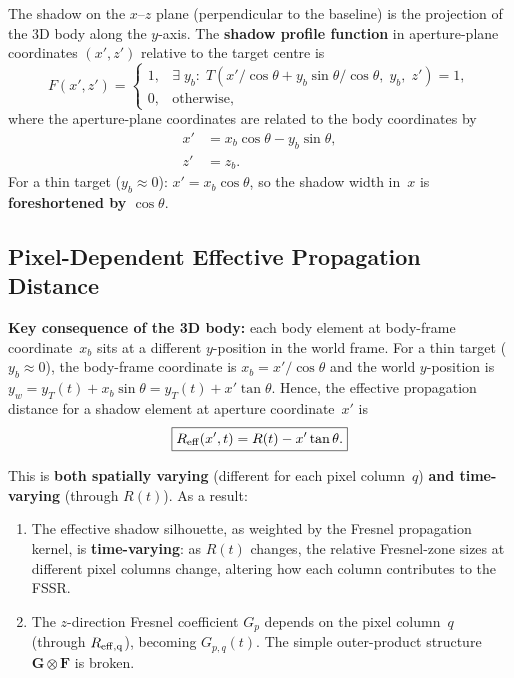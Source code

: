 \documentclass[11pt,a4paper]{article}
\begin{document}
The shadow on the $x$--$z$ plane (perpendicular to the baseline) is
the projection of the 3D body along the $y$-axis.  The \textbf{shadow
profile function} in aperture-plane coordinates $(x',z')$ relative to
the target centre is
\begin{equation}
  F(x',z') =
  \begin{cases}
    1, & \exists\;y_b:\;T(x'/\!\cos\theta + y_b\sin\theta/\!\cos\theta,
    \;y_b,\;z')=1,\\
    0, & \text{otherwise},
  \end{cases}
  \label{eq:shadow_profile}
\end{equation}
where the aperture-plane coordinates are related to the body
coordinates by
\begin{align}
  x' &= x_b\cos\theta - y_b\sin\theta, \label{eq:xprime}\\
  z' &= z_b. \label{eq:zprime}
\end{align}
For a thin target ($y_b\approx 0$):
$x'=x_b\cos\theta$, so the shadow width in~$x$ is
\textbf{foreshortened by $\cos\theta$}.

\subsection{Pixel-Dependent Effective Propagation Distance}
\label{sec:pixel_R}

\textbf{Key consequence of the 3D body:} each body element at
body-frame coordinate~$x_b$ sits at a different $y$-position in the
world frame.  For a thin target ($y_b\approx 0$), the body-frame
coordinate is $x_b = x'/\!\cos\theta$ and the world $y$-position is
$y_w = y_T(t) + x_b\sin\theta = y_T(t) + x'\tan\theta$.  Hence, the
effective propagation distance for a shadow element at aperture
coordinate~$x'$ is
\begin{equation}
  \boxed{R_{\rm eff}(x',t) = R(t) - x'\tan\theta.}
  \label{eq:R_eff_pixel}
\end{equation}

This is \textbf{both spatially varying} (different for each pixel
column~$q$) \textbf{and time-varying} (through $R(t)$).  As a result:
\begin{enumerate}
  \item The effective shadow silhouette, as weighted by the Fresnel
    propagation kernel, is \textbf{time-varying}: as $R(t)$ changes,
    the relative Fresnel-zone sizes at different pixel columns change,
    altering how each column contributes to the FSSR.
  \item The $z$-direction Fresnel coefficient $G_p$ depends on the
    pixel column~$q$ (through $R_{\rm eff,q}$), becoming
    $G_{p,q}(t)$.  The simple outer-product structure
    $\mathbf{G}\otimes\mathbf{F}$ is broken.
\end{enumerate}
\end{document}
